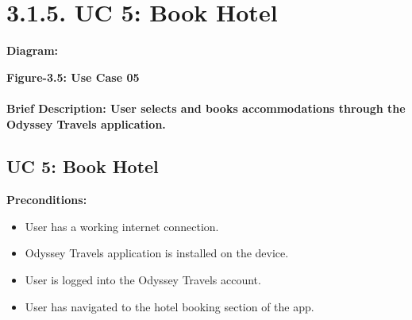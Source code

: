 \documentclass{scrreprt}
\begin{document}
\section*{\textbf{3.1.5. UC 5: Book Hotel}}


\textbf{Diagram:}
\newline
\newline
\begin{center}
    \parbox{0.8\textwidth}{ 
        \centering
    }
\end{center}
\begin{center}
    \parbox{0.8\textwidth}{ 
        \centering
        \textbf{Figure-3.5: Use Case 05}
    }
\end{center}

\paragraph {\textnormal{Brief Description: 
User selects and books accommodations through the Odyssey Travels application.}}


\subsection*{\textbf{UC 5: Book Hotel}}

\textbf{Preconditions:}
\begin{itemize}
    \item User has a working internet connection.
    \item Odyssey Travels application is installed on the device.
    \item User is logged into the Odyssey Travels account.
    \item User has navigated to the hotel booking section of the app.
\end{itemize}
\end{document}
